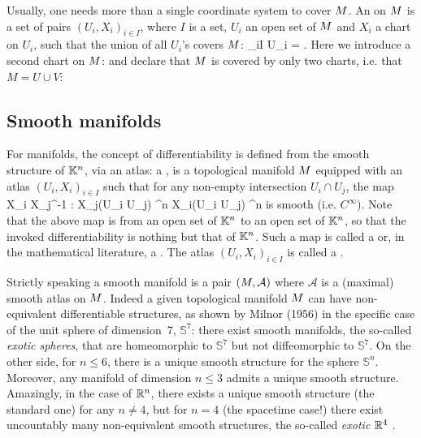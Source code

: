 Usually, one needs more than a single coordinate system to cover $M$.
An  on $M$ is a set of pairs
$(U_i,X_i)_{i\in I}$, where $I$ is a set, $U_i$ an open set of $M$ and $X_i$ a chart on $U_i$,
such that the union of all $U_i$'s covers $M$:
\be
    \bigcup_{i\in I} U_i = \M.
\ee
Here we introduce a second chart on $M$:
and declare that $M$ is covered by only two charts, i.e. that $M=U\cup V$:

\subsection{Smooth manifolds}

For manifolds, the concept of differentiability is
defined from the smooth structure of $\mathbb{K}^n$, via an atlas:
a ,
is a topological manifold $M$ equipped with an atlas
$(U_i,X_i)_{i\in I}$ such that for any non-empty intersection
$U_i \cap U_j$, the map
\be \label{e:bas:transition_map}
    X_i \circ X_j^{-1} : X_j(U_i \cap U_j)
    \subset \K^n \longrightarrow X_i(U_i \cap U_j)
    \subset \K^n
\ee
is smooth (i.e. $C^\infty$).
Note that the above map is from an open set of $\mathbb{K}^n$ to an open set of $\mathbb{K}^n$, so that the invoked differentiability is nothing but that of $\mathbb{K}^n$.
Such a map is called a  or, in the mathematical literature, a
.
The atlas $(U_i,X_i)_{i\in I}$ is called a
.

\begin{remark}
Strictly speaking a smooth manifold is a pair $(M,\mathcal{A})$  where
$\mathcal{A}$ is a (maximal) smooth atlas on $M$.
Indeed a given topological manifold $M$
can have non-equivalent differentiable structures, as shown by Milnor (1956) \cite{Milno56}
in the specific case of the unit sphere of dimension~7, $\mathbb{S}^7$: there exist smooth manifolds, the so-called \emph{exotic spheres},
that are homeomorphic to $\mathbb{S}^7$ but not diffeomorphic
to $\mathbb{S}^7$.  On the other side, for $n\leq 6$, there is a unique smooth
structure for the sphere $\mathbb{S}^n$.
Moreover, any manifold of dimension $n\leq 3$ admits a unique smooth structure.
Amazingly, in the case of $\mathbb{R}^n$, there exists a unique smooth structure (the standard one) for any $n\not=4$, but for $n=4$ (the spacetime case!) there exist uncountably many non-equivalent smooth structures, the so-called
\emph{exotic $\mathbb{R}^4$} \cite{Taube87}.
\end{remark}


